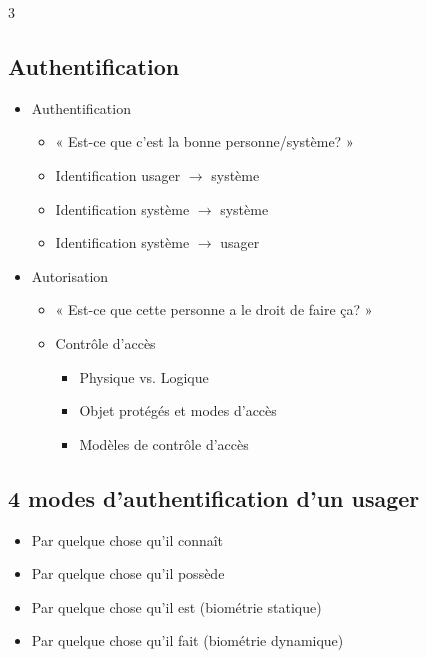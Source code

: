 \documentclass[9pt, a4paper, twoside]{article}
\begin{document}
\begin{multicols}{3}
\footnotesize \subsection{Authentification}

\begin{itemize}[label=$\bullet$]
    \item \scriptsize Authentification
    \begin{itemize}[label={}]
        \item \scriptsize « Est-ce que c'est la bonne personne/système? »
        \item \scriptsize Identification usager $\rightarrow$ système
        \item \scriptsize Identification système $\rightarrow$ système
        \item \scriptsize Identification système $\rightarrow$ usager
    \end{itemize}
    \item \scriptsize Autorisation
    \begin{itemize}[label={}]
        \item \scriptsize « Est-ce que cette personne a le droit de faire ça? »
        \item \scriptsize Contrôle d'accès
        \begin{itemize}[label=$\bullet$]
            \item \scriptsize Physique vs. Logique
            \item \scriptsize Objet protégés et modes d'accès
            \item \scriptsize Modèles de contrôle d'accès
        \end{itemize}
    \end{itemize}
\end{itemize}

\footnotesize \subsection{4 modes d'authentification d'un usager}

\begin{itemize}[label=$\bullet$]
    \item \scriptsize Par quelque chose qu'il connaît
    \item \scriptsize Par quelque chose qu'il possède
    \item \scriptsize Par quelque chose qu'il est (biométrie statique)
    \item \scriptsize Par quelque chose qu'il fait (biométrie dynamique)
\end{itemize}


\end{multicols}
\end{document}
